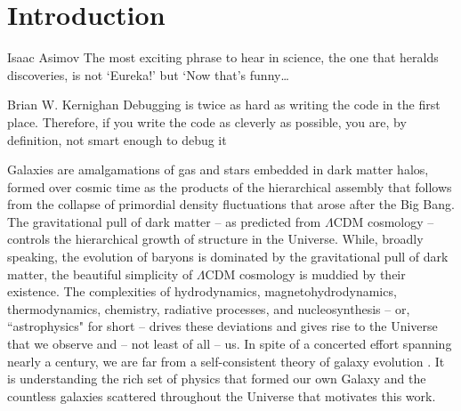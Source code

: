 \chapter[Introduction]{Introduction}
\label{ch:intro}
\vspace{-16pt} 
\begin{chapquote}{Isaac Asimov} \singlespacing The most exciting phrase to hear in science, the one that heralds discoveries, is not ‘Eureka!’ but ‘Now that’s funny…
\end{chapquote} \vspace{-8pt}
\begin{chapquote}{Brian W. Kernighan} \singlespacing Debugging is twice as hard as writing the code in the first place. Therefore, if you write the code as cleverly as possible, you are, by definition, not smart enough to debug it
\end{chapquote} \vspace{-8pt}

\noindent\makebox[\linewidth]{\rule{0.5\textwidth}{0.5pt}} \vspace{1pt}

\newcommand{\code}{\textsc}

%

Galaxies are amalgamations of gas and stars embedded in dark matter halos, formed over cosmic time as the products of the hierarchical assembly that follows from the collapse of primordial density fluctuations that arose after the Big Bang. The gravitational pull of dark matter -- as predicted from $\Lambda$CDM cosmology -- controls the hierarchical growth of structure in the Universe. While, broadly speaking, the evolution of baryons is dominated by the gravitational pull of dark matter, the beautiful simplicity of $\Lambda$CDM cosmology is muddied by their existence. The complexities of hydrodynamics, magnetohydrodynamics, thermodynamics, chemistry, radiative processes, and nucleosynthesis -- or, ``astrophysics" for short -- drives these deviations and gives rise to the Universe that we observe and -- not least of all -- us. In spite of a concerted effort spanning nearly a century, we are far from a self-consistent theory of galaxy evolution \citep[see ][ for a recent review of outstanding problems in galactic evolution]{NaabOstriker2017}. It is understanding the rich set of physics that formed our own Galaxy and the countless galaxies scattered throughout the Universe that motivates this work. 

